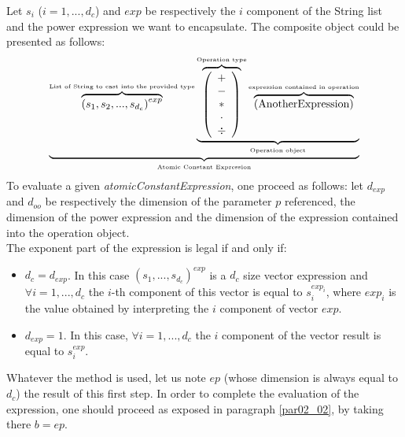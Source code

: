 \documentclass[a4paper,11pt] {article}
\begin{document}
Let $s_i$ ($i=1,...,d_c$) and $exp$ be respectively the $i$ component of the String list and the power expression we want to encapsulate. The composite object could be presented as follows:
\begin{equation}
 \underbrace{    \overbrace{ \left( s_1  , s_2, ..., s_{d_c}\right)^{exp} }^{\mbox{\tiny List of String  to cast into the provided type}}   \underbrace{  \overbrace{\left( \begin{array}{c} + \\ - \\ \ast  \\ \cdot \\ \div   \end{array} \right) }^{\mbox{\tiny Operation type}}
 \overbrace{    \left( \mbox{AnotherExpression}\right) }^{\mbox{\tiny expression contained in operation}}   }_{\mbox{\tiny Operation object}}}_{\mbox{\tiny Atomic Constant Expression}}
\end{equation}
To evaluate a given {\it atomicConstantExpression}, one proceed as follows: let $d_{exp}$ and $d_{oo}$ be respectively the dimension of the parameter $p$ referenced, the dimension of the power expression and the dimension of the expression contained into the operation object.\\
The exponent part of the expression is legal if and only if:
\begin{itemize}
\item $d_c = d_{exp}$. In this case $(s_1,...,s_{d_c})^{exp}$ is a $d_c$ size vector expression and $\forall i =1,...,d_c$ the $i$-th component of this vector is equal to $s_i^{exp_i}$, where $exp_i$ is the value obtained by interpreting the $i$ component of vector $exp$.
\item $d_{exp}=1$. In this case, $\forall i =1,...,d_c$ the $i$ component of the vector result is equal to $s_i^{exp}$.\\
\end{itemize}
Whatever the method is used, let us note $ep$ (whose dimension is always equal to $d_c$) the result of 
this first step.  In order to complete the evaluation of the expression, one should proceed as exposed in paragraph \ref{par02_02}, by taking there $b=ep$.
\end{document}
